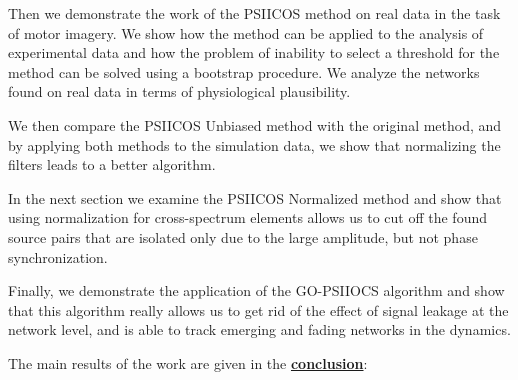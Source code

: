 Then we demonstrate the work of the PSIICOS method on real data in the task of
motor imagery. We show how the method can be applied to the analysis of
experimental data and how the problem of inability to select a threshold for
the method can be solved using a bootstrap procedure.  We analyze the networks
found on real data in terms of physiological plausibility.

We then compare the PSIICOS Unbiased method with the original method, and by
applying both methods to the simulation data, we show that normalizing the
filters leads to a better algorithm.

In the next section we examine the PSIICOS Normalized method and show that
using normalization for cross-spectrum elements allows us to cut off the found
source pairs that are isolated only due to the large amplitude, but not phase
synchronization.

Finally, we demonstrate the application of the GO-PSIIOCS algorithm and show
that this algorithm really allows us to get rid of the effect of signal leakage
at the network level, and is able to track emerging and fading networks in the
dynamics.



The main results of the work are given in the \underline{\textbf{conclusion}}:




